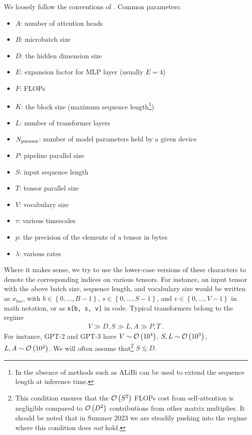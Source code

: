 \documentclass[11pt]{article}
\begin{document}
We loosely follow the conventions of \cite{korthikanti2022reducing}.  Common parameters:
\begin{itemize}
    \item $ A $: number of attention heads
    \item $ B $: microbatch size
    \item $ D $: the hidden dimension size
    \item $ E $: expansion factor for MLP layer (usually $ E=4 $)
    \item $ F $: FLOPs
    \item $ K $: the block size (maximum sequence length\footnote{In the absence of methods such as         ALiBi \cite{ALiBi}  can be used to extend the sequence length at inference time.})
    \item $ L $: number of transformer layers
    \item $ N _{ {\rm params}  } $: number of model parameters held by a given device
    \item $ P $: pipeline parallel size
    \item $ S $: input sequence length
    \item $ T $: tensor parallel size
    \item $ V $: vocabulary size
    \item $ \tau $: various timescales
    \item $ p $: the precision of the elements of a tensor in bytes
    \item $ \lambda  $: various rates
\end{itemize}
Where it makes sense, we try to use the lower-case versions of these characters to denote the
corresponding indices on various tensors. For instance, an input tensor with the above batch size,
sequence length, and vocabulary size would be written as $ x _{ bsv } $, with $ b \in \left \{ 0,
\ldots, B - 1 \right \} $, $ s \in \left \{ 0, \ldots, S - 1\right \} $, and $  v \in \left \{ 0,
    \ldots, V -1\right \}$ in math notation, or as \texttt{x[b, s, v]} in code.  Typical
    transformers belong to the regime
\begin{gather}
V \gg D, S \gg L, A \gg P, T \ .  \label{app_eq_transformers_approxs}
\end{gather}
For instance, GPT-2 and GPT-3 \cite{gpt2radford2019language, gpt3brown2020language} have $ V \sim \mathcal{O} \left( 10 ^{ 4 } \right)  $,
$ S, L \sim \mathcal{O} \left( 10 ^{ 3 } \right)  $, $ L, A \sim \mathcal{O} \left( 10 ^{ 2 } \right)  $. We
will often assume that\footnote{This condition ensures that the $ \mathcal{O} \left( S ^{ 2 } \right)  $
    FLOPs cost from self-attention is negligible compared to $ \mathcal{O} \left( D ^{ 2 } \right)  $
    contributions from other matrix multiplies.  It should be noted that in Summer 2023 we are
steadily pushing into the regime where this condition does \textit{not}  hold.} $ S \lesssim D $.
\end{document}

